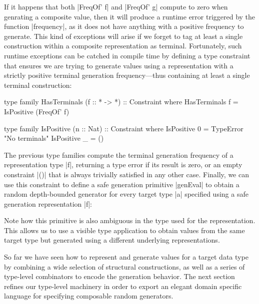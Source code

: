 If it happens that both |FreqOf' f| and |FreqOf' g| compute to zero when
genrating a composite value, then it will produce a runtime error triggered by
the function |frequency|, as it does not have anything with a positive frequency
to generate.
%
This kind of exceptions will arise if we forget to tag at least a single
construction within a composite representation as terminal.
%
Fortunately, such runtime exceptions can be catched in compile time by defining
a type constraint that ensures we are trying to generate values using a
representation with a strictly positive terminal generation frequency---thus
containing at least a single terminal construction:

\begin{code}
type family HasTerminals (f :: * -> *) :: Constraint where
  HasTerminals f = IsPositive (FreqOf' f)

type family IsPositive (n :: Nat) :: Constraint where
  IsPositive 0 = TypeError "No terminals"
  IsPositive _ = ()
\end{code}
%
The previous type families compute the terminal generation frequency of a
representation type |f|, returning a type error if its result is zero, or an
empty constraint |()| that is always trivially satisfied in any other case.
%
Finally, we can use this constraint to define a safe generation primitive
|genEval| to obtain a random depth-bounded generator for every target type |a|
specified using a safe generation representation |f|:


Note how this primitive is also ambiguous in the type used for the
representation.
%
This allows us to use a visible type application to obtain values from the same
target type but generated using a different underlying representations.


So far we have seen how to represent and generate values for a target data type
by combining a wide selection of structural constructions, as well as a series
of type-level combinators to encode the generation behavior.
%
The next section refines our type-level machinery in order to export an elegant
domain specific language for specifying composable random generators.
